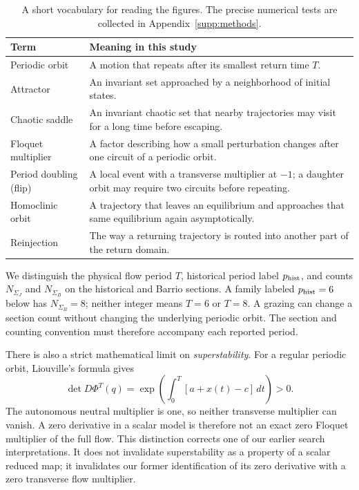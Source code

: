 \begin{table}[tbp]
\centering
\small
\renewcommand{\arraystretch}{1.2}
\begin{tabularx}{\textwidth}{@{}P{0.23\textwidth}X@{}}
\toprule
Term & Meaning in this study \\
\midrule
Periodic orbit & A motion that repeats after its smallest return time $T$. \\
Attractor & An invariant set approached by a neighborhood of initial states. \\
Chaotic saddle & An invariant chaotic set that nearby trajectories may visit
for a long time before escaping. \\
Floquet multiplier & A factor describing how a small perturbation changes
after one circuit of a periodic orbit. \\
Period doubling (flip) & A local event with a transverse multiplier at $-1$;
a daughter orbit may require two circuits before repeating. \\
Homoclinic orbit & A trajectory that leaves an equilibrium and approaches
that same equilibrium again asymptotically. \\
Reinjection & The way a returning trajectory is routed into another part
of the return domain. \\
\bottomrule
\end{tabularx}
\caption{A short vocabulary for reading the figures. The precise numerical
tests are collected in Appendix~\ref{supp:methods}.}
\label{tab:vocabulary}
\end{table}

We distinguish the physical flow period $T$, historical period label
$p_{\rm hist}$, and counts $N_{\Sigma_J}$ and $N_{\Sigma_B}$ on the historical
and Barrio sections. A family labeled $p_{\rm hist}=6$ below has
$N_{\Sigma_B}=8$; neither integer means $T=6$ or $T=8$. A grazing can change
a section count without changing the underlying periodic orbit. The section
and counting convention must therefore accompany each reported period.

There is also a strict mathematical limit on \emph{superstability}. For a
regular periodic orbit, Liouville's formula \citep{teschl2012ordinary} gives
\begin{equation}
\label{eq:liouville}
  \det D\Phi^T(q)=
  \exp\!\left(\int_0^T [a+x(t)-c]\,dt\right)>0.
\end{equation}
The autonomous neutral multiplier is one, so neither transverse multiplier
can vanish. A zero derivative in a scalar model is therefore not an exact
zero Floquet multiplier of the full flow. This distinction corrects one of
our earlier search interpretations.
It does not invalidate superstability as a property of a scalar reduced map;
it invalidates our former identification of its zero derivative with a zero
transverse flow multiplier.

